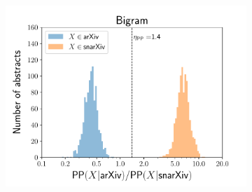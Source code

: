 \documentclass[paperwidth=40in,paperheight=32in,margin=1in,fontscale=0.33]{baposter}
\begin{document}
\begin{poster}
{\begin{figure}[H]
{\begin{subfigure}[t]{.49\textwidth}
			\centering
			\includegraphics[width=\textwidth]{figures/bi_histogram.pdf}
		\end{subfigure}}
	\end{figure}
}
\setlength{\fboxsep}{1mm}



	





% 	
% 	

\end{poster}
\end{document}

